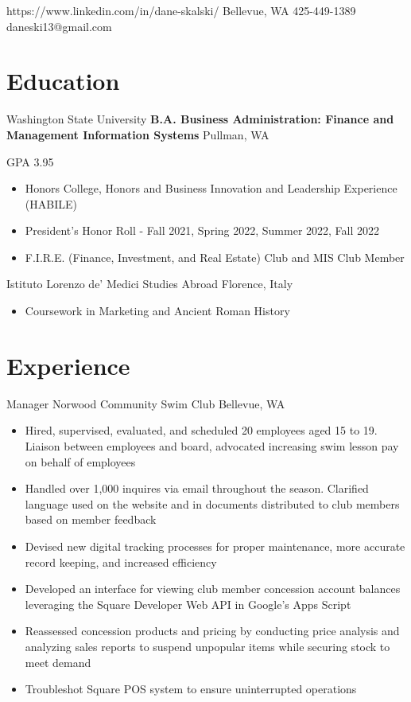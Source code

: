 \documentclass[10pt]{article}
\begin{document}
{https://www.linkedin.com/in/dane-skalski/}
{Bellevue, WA}
{425-449-1389}
{daneski13@gmail.com}

\section{Education}
{Washington State University}
{\textbf{B.A. Business Administration: Finance and Management Information Systems}}
{Pullman, WA}
{
    GPA 3.95
    \begin{itemize}
        \item Honors College, Honors and Business Innovation and Leadership Experience (HABILE)
        \item President's Honor Roll - Fall 2021, Spring 2022, Summer 2022, Fall 2022
        \item F.I.R.E. (Finance, Investment, and Real Estate) Club and MIS Club Member
    \end{itemize}
}

{Istituto Lorenzo de' Medici}
{Studies Abroad}
{Florence, Italy}
{
    \begin{itemize}
        \item Coursework in Marketing and Ancient Roman History
    \end{itemize}
}

\section{Experience}
{Manager}
{Norwood Community Swim Club}
{Bellevue, WA}
{
    \begin{itemize}
        \item Hired, supervised, evaluated, and scheduled 20 employees aged 15 to 19. Liaison between employees and board, advocated increasing swim lesson pay on behalf of employees

        \item Handled over 1,000 inquires via email throughout the season. Clarified language used on the website and in documents distributed to club members based on member feedback

        \item Devised new digital tracking processes for proper maintenance, more accurate record keeping, and increased efficiency

        \item Developed an interface for viewing club member concession account balances leveraging the Square Developer Web API in Google's Apps Script

        \item Reassessed concession products and pricing by conducting price analysis and analyzing sales reports to suspend unpopular items while securing stock to meet demand

        \item Troubleshot Square POS system to ensure uninterrupted operations
    \end{itemize}
}
\end{document}
